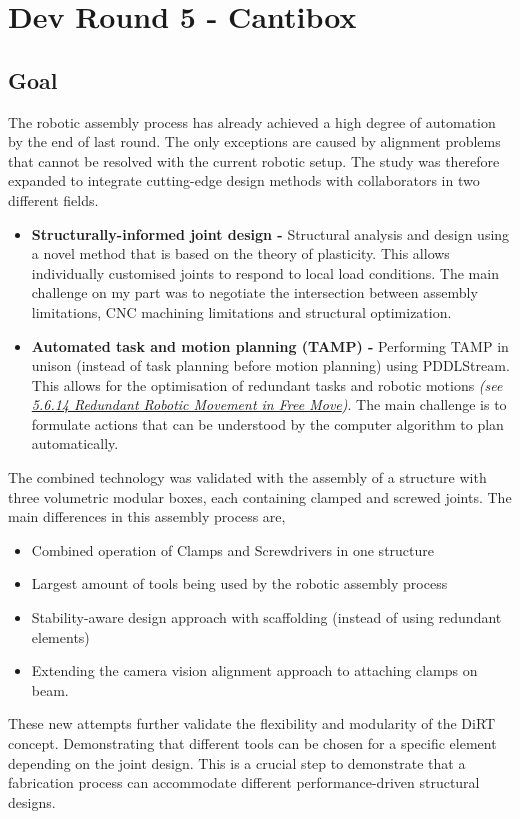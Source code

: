 \chapter{Dev Round 5 - Cantibox}

\section{Goal}

The robotic assembly process has already achieved a high degree of automation by the end of last round. The only exceptions are caused by alignment problems that cannot be resolved with the current robotic setup. The study was therefore expanded to integrate cutting-edge design methods with collaborators in two different fields. 

\begin{itemize}
	\item \textbf{Structurally-informed joint design -} Structural analysis and design using a novel method that is based on the theory of plasticity. This allows individually customised joints to respond to local load conditions. The main challenge on my part was to negotiate the intersection between assembly limitations, CNC machining limitations and structural optimization. 

	\item \textbf{Automated task and motion planning (TAMP) -} Performing TAMP in unison (instead of task planning before motion planning) using PDDLStream. This allows for the optimisation of redundant tasks and robotic motions \textit{(see \ul{5.6.14 Redundant Robotic Movement in Free Move})}. The main challenge is to formulate actions that can be understood by the computer algorithm to plan automatically. 

\end{itemize}
The combined technology was validated with the assembly of a structure with three volumetric modular boxes, each containing clamped and screwed joints. The main differences in this assembly process are,

\begin{itemize}
	\item Combined operation of Clamps and Screwdrivers in one structure

	\item Largest amount of tools being used by the robotic assembly process

	\item Stability-aware design approach with scaffolding (instead of using redundant elements)

	\item Extending the camera vision alignment approach to attaching clamps on beam.

\end{itemize}
These new attempts further validate the flexibility and modularity of the DiRT concept. Demonstrating that different tools can be chosen for a specific element depending on the joint design. This is a crucial step to demonstrate that a fabrication process can accommodate different performance-driven structural designs.  

